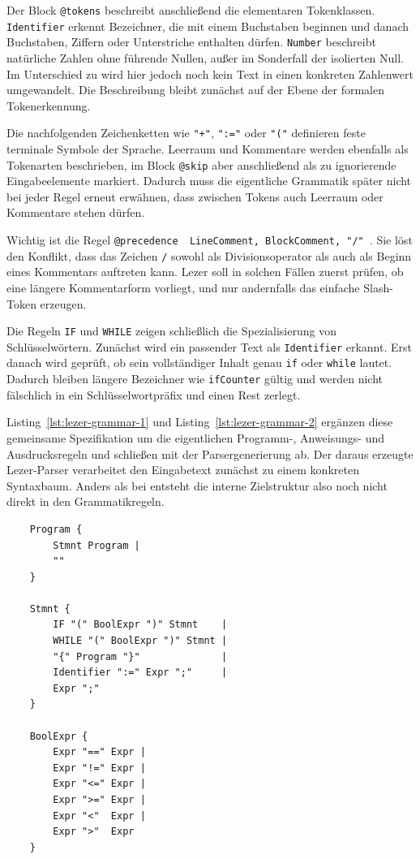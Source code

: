 Der Block \texttt{@tokens} beschreibt anschließend die elementaren Tokenklassen. \texttt{Identifier} erkennt Bezeichner, die mit einem Buchstaben beginnen und danach Buchstaben, Ziffern oder Unterstriche enthalten dürfen. \texttt{Number} beschreibt natürliche Zahlen ohne führende Nullen, außer im Sonderfall der isolierten Null. Im Unterschied zu \emph{} wird hier jedoch noch kein Text in einen konkreten Zahlenwert umgewandelt. Die Beschreibung bleibt zunächst auf der Ebene der formalen Tokenerkennung.

Die nachfolgenden Zeichenketten wie \texttt{"+"}, \texttt{":="} oder \texttt{"("} definieren feste terminale Symbole der Sprache. Leerraum und Kommentare werden ebenfalls als Tokenarten beschrieben, im Block \texttt{@skip} aber anschließend als zu ignorierende Eingabeelemente markiert. Dadurch muss die eigentliche Grammatik später nicht bei jeder Regel erneut erwähnen, dass zwischen Tokens auch Leerraum oder Kommentare stehen dürfen.

Wichtig ist die Regel \texttt{@precedence { LineComment, BlockComment, "/" }}. Sie löst den Konflikt, dass das Zeichen \texttt{/} sowohl als Divisionsoperator als auch als Beginn eines Kommentars auftreten kann. Lezer soll in solchen Fällen zuerst prüfen, ob eine längere Kommentarform vorliegt, und nur andernfalls das einfache Slash-Token erzeugen.

Die Regeln \texttt{IF} und \texttt{WHILE} zeigen schließlich die Spezialisierung von Schlüsselwörtern. Zunächst wird ein passender Text als \texttt{Identifier} erkannt. Erst danach wird geprüft, ob sein vollständiger Inhalt genau \texttt{if} oder \texttt{while} lautet. Dadurch bleiben längere Bezeichner wie \texttt{ifCounter} gültig und werden nicht fälschlich in ein Schlüsselwortpräfix und einen Rest zerlegt.

Listing~\ref{lst:lezer-grammar-1} und Listing~\ref{lst:lezer-grammar-2} ergänzen diese gemeinsame Spezifikation um die eigentlichen Programm-, Anweisungs- und Ausdrucksregeln und schließen mit der Parsergenerierung ab. Der daraus erzeugte Lezer-Parser verarbeitet den Eingabetext zunächst zu einem konkreten Syntaxbaum. Anders als bei \emph{} entsteht die interne Zielstruktur also noch nicht direkt in den Grammatikregeln.

\begin{listing}[htbp]
\caption{Fortsetzung der Lezer-Grammatik (Teil 1: Anweisungen)}
\label{lst:lezer-grammar-1}
\begin{verbatim}
    Program {
        Stmnt Program | 
        ""
    }

    Stmnt {
        IF "(" BoolExpr ")" Stmnt    |
        WHILE "(" BoolExpr ")" Stmnt |
        "{" Program "}"              |
        Identifier ":=" Expr ";"     |
        Expr ";"
    }

    BoolExpr {
        Expr "==" Expr |
        Expr "!=" Expr |
        Expr "<=" Expr |
        Expr ">=" Expr |
        Expr "<"  Expr |
        Expr ">"  Expr
    }
\end{verbatim}
\end{listing}

